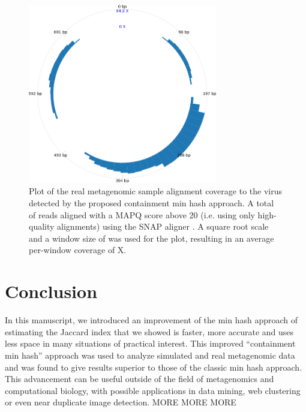 \documentclass[11pt,reqno]{amsart}
\theoremstyle{remark}
\numberwithin{equation}{section}
\newcommand{\FoundOrganismName}{\protect }
\newcommand{\MeanCoverage}{\protect }
\newcommand{\NumReadsAligned}{\protect }
\newcommand{\WindowSize}{\protect }
\begin{document}
\begin{figure}[!h]%
\begin{center}
\includegraphics[width=3.25in,trim={0 0 0 0in},clip]{Figs/CoveragePlot.png}%
\end{center}
\caption{Plot of the real metagenomic sample alignment coverage to the virus \textit{\FoundOrganismName} detected by the proposed containment min hash approach. A total of \NumReadsAligned reads aligned with a MAPQ score above 20 (i.e. using only high-quality alignments) using the SNAP aligner \cite{zaharia2011faster}. A square root scale and a window size of \WindowSize was used for the plot, resulting in an average per-window coverage of \MeanCoverage \unskip X.
}
\label{fig:ViralCoverage}%
\end{figure}


\section{Conclusion}
In this manuscript, we introduced an improvement of the min hash approach of estimating the Jaccard index that we showed is faster, more accurate and uses less space in many situations of practical interest. This improved ``containment min hash'' approach was used to analyze simulated and real metagenomic data and was found to give results superior to those of the classic min hash approach. This advancement can be useful outside of the field of metagenomics and computational biology, with possible applications in data mining, web clustering or even near duplicate image detection.
MORE MORE MORE


{}

\end{document}
